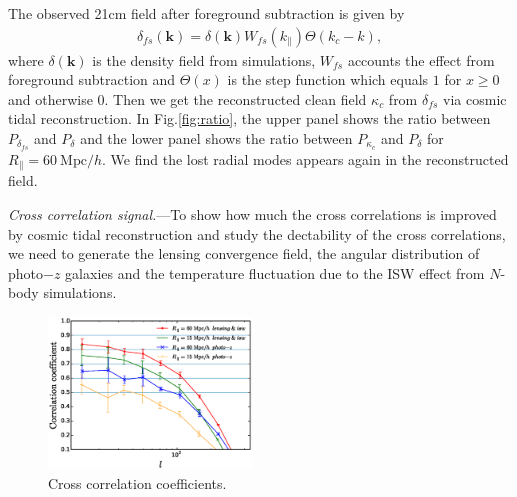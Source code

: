 \documentclass[aps,prl,twocolumn,showpacs,superscriptaddress,groupedaddress,nofootinbib]{revtex4}  %
\newcommand{\mr}{\mathrm}
\begin{document}
The observed 21cm field after foreground subtraction is given by 
\begin{eqnarray}
\delta_{fs}(\bm{k})=\delta(\bm{k})W_{fs}(k_\parallel)\Theta(k_c-k),
\end{eqnarray}
where $\delta(\bm{k})$ is the density field from simulations, $W_{fs}$ accounts
the effect from foreground subtraction and $\Theta(x)$ is the step function 
which equals $1$ for $x\ge0$ and otherwise $0$.
Then we get the reconstructed clean field $\kappa_c$ from $\delta_{fs}$ via
cosmic tidal reconstruction. In Fig.\ref{fig:ratio}, the upper panel shows the 
ratio between $P_{\delta_{fs}}$ and $P_{\delta}$ and the lower panel shows the
ratio between $P_{\kappa_c}$ and $P_\delta$ for $R_\parallel=60\ \mr{Mpc}/h$. 
We find the lost radial modes appears again in the reconstructed field.

{\it Cross correlation signal.}---To show how much the cross correlations is 
improved by cosmic tidal reconstruction and study the dectability of the
cross correlations, we need to generate the lensing convergence field,
the angular distribution of photo$-z$ galaxies and the temperature fluctuation
due to the ISW effect from $N$-body simulations.

\begin{figure}[tbp]
\begin{center}
\includegraphics[width=0.48\textwidth]{fig1b.eps}
\end{center}
\vspace{-0.7cm}
\caption{Cross correlation coefficients.}
\label{fig:cc}
\end{figure}

\end{document}
